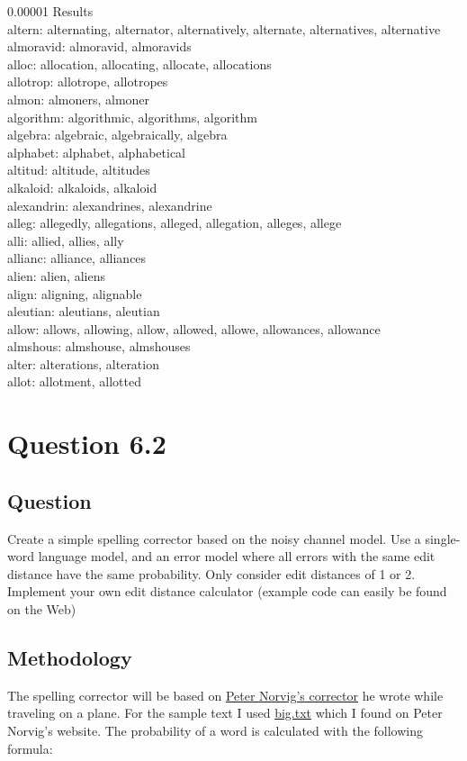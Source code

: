 \documentclass[10pt,letterpaper,bibliography=totoc]{scrartcl}
\begin{document}
0.00001 Results\\
altern: alternating, alternator, alternatively, alternate, alternatives, alternative\\
almoravid: almoravid, almoravids\\
alloc: allocation, allocating, allocate, allocations\\
allotrop: allotrope, allotropes\\
almon: almoners, almoner\\
algorithm: algorithmic, algorithms, algorithm\\
algebra: algebraic, algebraically, algebra\\
alphabet: alphabet, alphabetical\\
altitud: altitude, altitudes\\
alkaloid: alkaloids, alkaloid\\
alexandrin: alexandrines, alexandrine\\
alleg: allegedly, allegations, alleged, allegation, alleges, allege\\
alli: allied, allies, ally\\
allianc: alliance, alliances\\
alien: alien, aliens\\
align: aligning, alignable\\
aleutian: aleutians, aleutian\\
allow: allows, allowing, allow, allowed, allowe, allowances, allowance\\
almshous: almshouse, almshouses\\
alter: alterations, alteration\\
allot: allotment, allotted\\

\section{Question 6.2}
\subsection {Question}
Create a simple spelling corrector based on the noisy channel model. Use a single-word language model, and an error model where all errors with the same edit distance have the same probability. Only consider edit distances of 1 or 2. Implement your own edit distance calculator (example code can easily be found on the Web)

\subsection{Methodology}
The spelling corrector will be based on \href{http://norvig.com/spell-correct.html}{Peter Norvig's corrector} he wrote while traveling on a plane. For the sample text I used \href{http://norvig.com/big.txt}{big.txt} which I found on Peter Norvig's website. The probability of a word is calculated with the following formula:
\end{document}
